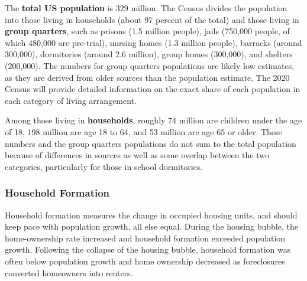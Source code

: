 \documentclass{report}
\begin{document}
{\begin{minipage}{0.76\textwidth}
The \textbf{total US population} is 329 million. The Census divides the population into those living in households (about 97 percent of the total) and those living in \textbf{group quarters}, such as prisons (1.5 million people), jails (750,000 people, of which 480,000 are pre-trial), nursing homes (1.3 million people), barracks (around 300,000), dormitories (around 2.6 million), group homes (300,000), and shelters (200,000). The numbers for group quarters populations are likely low estimates, as they are derived from older sources than the population estimate. The 2020 Census will provide detailed information on the exact share of each population in each category of living arrangement.

Among those living in \textbf{households}, roughly 74 million are children under the age of 18, 198 million are age 18 to 64, and 53 million are age 65 or older. These numbers and the group quarters populations do not sum to the total population because of differences in sources as well as some overlap between the two categories, particularly for those in school dormitories. 
\end{minipage}
\newpage
\subsubsection*{\color{black!70} \seriffont Household Formation}
\begin{minipage}{0.76\textwidth}
\small Household formation measures the change in occupied housing units, and should keep pace with population growth, all else equal. During the housing bubble, the home-ownership rate increased and household formation exceeded population growth. Following the collapse of the housing bubble, household formation was often below population growth and home ownership decreased as foreclosures converted homeowners into renters. 



\vspace{2mm}


\end{minipage}}
\end{document}
